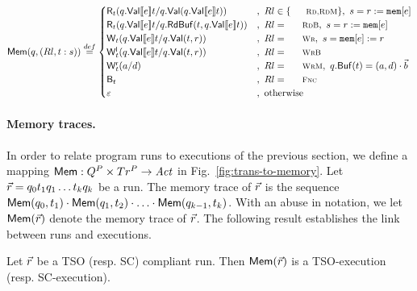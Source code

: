 \begin{figure*}[th]
{\small
\[
\alimemtracex {q,(Rl,t:s)} \stackrel{def}{=} 
 \begin{cases}
  \alireadx t {q.\alivaluation{\alievalx e}t} {q.\alivaluationx {q.\alivaluation{\alievalx e}t}} & ,\ Rl\in\{\textnormal{\sc\small Rd,RdM}\},\ s=r:=\alimemx e\\
  \alireadx t {q.\alivaluation{\alievalx e}t} {q.\alireadbufferx t {q.\alivaluation{\alievalx e}t}} &,\ Rl=\textnormal{\sc\small RdB},\ s=r:=\alimemx e\\
  \aliwritex t {q.\alivaluation{\alievalx e}t} {q.\alivaluationx {t,r}} &,\ Rl=\textnormal{\sc\small Wr},\ s=\alimemx e:= r\\
  \locwritex t {q.\alivaluation{\alievalx e}t} {q.\alivaluationx {t,r}} &,\ Rl=\textnormal{\sc\small WrB}\\
  \remwritex t a d &,\ Rl=\textnormal{\sc\small WrM},\ q.\alibufferx t=(a,d)\cdot \alisequencex b\\
  \alibarrierx t &,\ Rl=\textnormal{\sc \small Fnc}\\
  \varepsilon &,\ \textnormal{otherwise}
 \end{cases}
\]
}
\caption{Mapping transitions to memory operations.}
\label{fig:trans-to-memory}
\end{figure*}


\paragraph{Memory traces.}
In order to relate program runs to executions of the previous section, we define a mapping $\mathsf{Mem}:Q^{P}\times Tr^{P} \rightarrow \mathit{Act}$ in Fig.~\ref{fig:trans-to-memory}.
Let $\vec{r}=q_0t_1q_1\ldots t_kq_k$ be a run.
The memory trace of $\vec{r}$ is the sequence $\mathsf{Mem}(q_0,t_1)\cdot \mathsf{Mem}(q_1,t_2) \cdot \ldots \cdot \mathsf{Mem}(q_{k-1},t_k)$.
With an abuse in notation, we let $\mathsf{Mem}(\vec{r})$ denote the memory trace of $\vec{r}$.
The following result establishes the link between runs and executions.

\begin{proposition}
Let $\vec{r}$ be a TSO (resp. SC) compliant run.
Then $\mathsf{Mem}(\vec{r})$ is a TSO-execution (resp. SC-execution).
\end{proposition}
